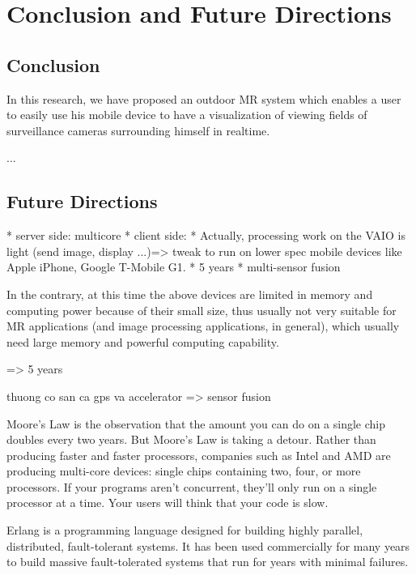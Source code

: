 \chapter{Conclusion and Future Directions}
\label{Chapter6}


\section{Conclusion}

In this research, we have proposed an outdoor MR system which enables a user to easily use his mobile device to have a visualization of viewing fields of surveillance cameras surrounding himself in realtime.

...


\section{Future Directions}


* server side: multicore
* client side:
	* Actually, processing work on the VAIO is light (send image, display ...)=> tweak to run on lower spec mobile devices like Apple iPhone, Google T-Mobile G1.
	* 5 years
* multi-sensor fusion


In the contrary, at this time the above devices are limited in memory and computing power because of their small size, thus usually not very suitable for MR applications (and image processing applications, in general), which usually need large memory and powerful computing capability.

=> 5 years

thuong co san ca gps va accelerator => sensor fusion

Moore's Law is the observation that the amount you can do on a single chip doubles every two years. But Moore's Law is taking a detour. Rather than producing faster and faster processors, companies such as Intel and AMD are producing multi-core devices: single chips containing two, four, or more processors. If your programs aren't concurrent, they'll only run on a single processor at a time. Your users will think that your code is slow.

Erlang is a programming language designed for building highly parallel, distributed, fault-tolerant systems. It has been used commercially for many years to build massive fault-tolerated systems that run for years with minimal failures.

